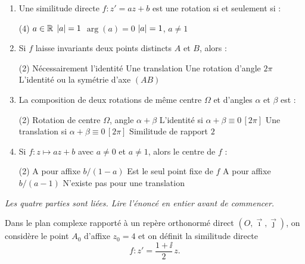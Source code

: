 \begin{enumerate}
	\item Une similitude directe $f : z' = az + b$ est une rotation si et seulement si :
	\begin{qcm}(4)
		\task $a \in \mathbb{R}$
		\task $\left|a\right| = 1$
		\task $\arg(a) = 0$
		\task $\left|a\right| = 1$, $a \neq 1$
	\end{qcm}

	\item Si $f$ laisse invariants deux points distincts $A$ et $B$, alors :
	\begin{qcm}(2)
		\task Nécessairement l'identité
		\task Une translation
		\task Une rotation d'angle $2\pi$
		\task L'identité ou la symétrie d'axe $(AB)$
	\end{qcm}

	\item La composition de deux rotations de même centre $\Omega$ et d'angles
	$\alpha$ et $\beta$ est :
	\begin{qcm}(2)
		\task Rotation de centre $\Omega$, angle $\alpha + \beta$
		\task L'identité si $\alpha + \beta \equiv 0\,[2\pi]$
		\task Une translation si $\alpha + \beta \equiv 0\,[2\pi]$
		\task Similitude de rapport $2$
	\end{qcm}

	\item Si $f : z \mapsto az + b$ avec $a \neq 0$ et $a \neq 1$, alors le centre de $f$ :
	\begin{qcm}(2)
		\task A pour affixe $b/(1-a)$
		\task Est le seul point fixe de $f$
		\task A pour affixe $b/(a-1)$
		\task N'existe pas pour une translation
	\end{qcm}
\end{enumerate}





\textit{Les quatre parties sont liées. Lire l'énoncé en entier avant de commencer.}

\bigskip

Dans le plan complexe rapporté à un repère orthonormé direct $(O, \vec{\imath}, \vec{\jmath})$,
on considère le point $A_0$ d'affixe $z_0 = 4$ et on définit la similitude directe
$$
f : z' = \frac{1+\ii}{2}\,z.
$$

